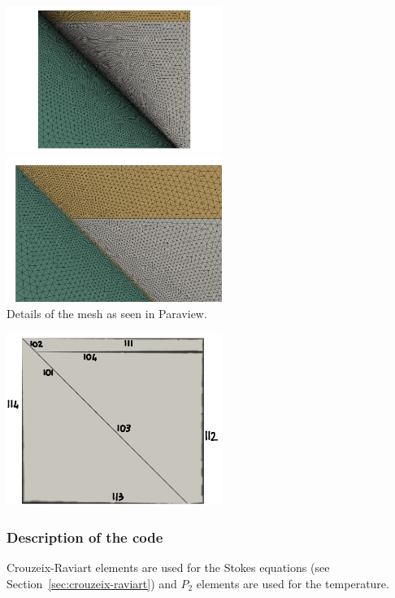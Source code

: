 \begin{center}
\includegraphics[width=7cm]{python_codes/fieldstone_68/images/mesh1}
\includegraphics[width=7cm]{python_codes/fieldstone_68/images/mesh2}\\
{\captionfont Details of the mesh as seen in Paraview.}
\end{center}

\begin{center}
\includegraphics[width=7cm]{python_codes/fieldstone_68/images/interfaces}
\end{center}

\subsubsection*{Description of the code}


Crouzeix-Raviart elements are used for the Stokes equations (see Section~\ref{sec:crouzeix-raviart}) 
and $P_2$ elements are used for the temperature. 




